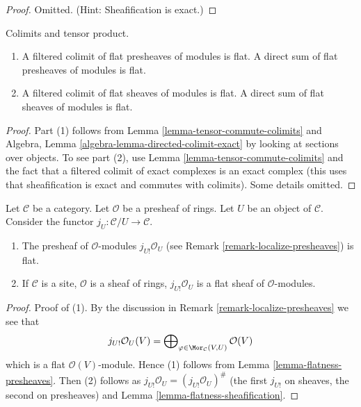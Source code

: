 \begin{proof}
Omitted. (Hint: Sheafification is exact.)
\end{proof}

\begin{lemma}
\label{lemma-colimits-flat}
Colimits and tensor product.
\begin{enumerate}
\item A filtered colimit of flat presheaves of modules
is flat. A direct sum of flat presheaves of modules is flat.
\item A filtered colimit of flat sheaves of modules is flat.
A direct sum of flat sheaves of modules is flat.
\end{enumerate}
\end{lemma}

\begin{proof}
Part (1) follows from Lemma \ref{lemma-tensor-commute-colimits} and
Algebra, Lemma \ref{algebra-lemma-directed-colimit-exact}
by looking at sections over objects.
To see part (2), use Lemma \ref{lemma-tensor-commute-colimits} and
the fact that a filtered colimit of exact
complexes is an exact complex (this uses that sheafification is exact
and commutes with colimits). Some details omitted.
\end{proof}

\begin{lemma}
\label{lemma-j-shriek-flat}
Let $\mathcal{C}$ be a category.
Let $\mathcal{O}$ be a presheaf of rings.
Let $U$ be an object of $\mathcal{C}$.
Consider the functor $j_U : \mathcal{C}/U \to \mathcal{C}$.
\begin{enumerate}
\item The presheaf of $\mathcal{O}$-modules
$j_{U!}\mathcal{O}_U$ (see
Remark \ref{remark-localize-presheaves})
is flat.
\item If $\mathcal{C}$ is a site, $\mathcal{O}$ is a sheaf of rings,
$j_{U!}\mathcal{O}_U$ is a flat sheaf of $\mathcal{O}$-modules.
\end{enumerate}
\end{lemma}

\begin{proof}
Proof of (1). By the discussion in
Remark \ref{remark-localize-presheaves}
we see that
$$
j_{U!}\mathcal{O}_U(V)
=
\bigoplus\nolimits_{\varphi \in \Mor_\mathcal{C}(V, U)}
\mathcal{O}(V)
$$
which is a flat $\mathcal{O}(V)$-module. Hence (1) follows from
Lemma \ref{lemma-flatness-presheaves}.
Then (2) follows as $j_{U!}\mathcal{O}_U = (j_{U!}\mathcal{O}_U)^\#$
(the first $j_{U!}$ on sheaves, the second on presheaves)
and Lemma \ref{lemma-flatness-sheafification}.
\end{proof}

